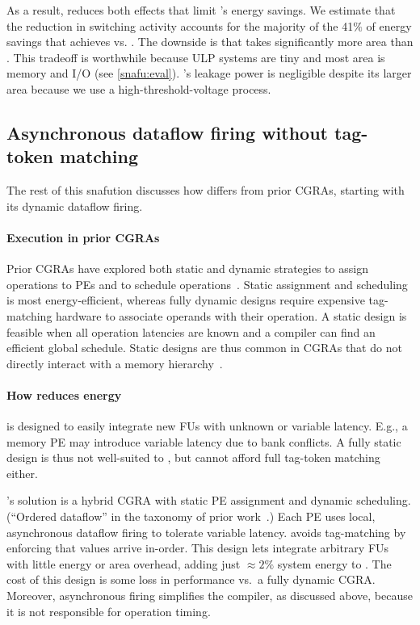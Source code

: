 As a result, \snafuframe reduces both effects that limit \manic's energy savings.
%
We estimate that the reduction in switching activity accounts for the majority of the 41$\%$ of energy savings that \snafuframe achieves vs. \manic. 
%
The downside is that \snafu takes significantly more area
than \manic.
This tradeoff is worthwhile because ULP systems are tiny and most area is memory and I/O
(see \autoref{snafu:eval}).
%
\snafu's leakage power is negligible despite its larger area because we use a high-threshold-voltage process.

\subsection{Asynchronous dataflow firing without tag-token matching}

The rest of this snafution discusses how \snafuframe differs from prior CGRAs,
starting with its dynamic dataflow firing.

\paragraph{Execution in prior CGRAs}
%
Prior CGRAs have explored both static and dynamic strategies
to assign operations to PEs
and to schedule operations~\cite{weng2020hybrid}.
%
Static assignment and scheduling is most energy-efficient,
whereas fully dynamic designs require expensive tag-matching hardware to associate operands with their operation.
%
A static design is feasible when all operation latencies are known and a
compiler can find an efficient global schedule.
%
Static designs are thus common in CGRAs that do not directly interact with a memory hierarchy~\cite{dyser,karunaratne2017hycube,nowatzki:isca17:stream-dataflow}.

\paragraph{How \snafu reduces energy}
%
\snafuframe is designed to easily integrate new FUs with unknown or variable
latency.
%
E.g., a memory PE may introduce variable latency due to bank conflicts.
%
A fully static design is thus not well-suited to \snafuframe, but \snafuframe cannot afford full tag-token matching either.

\snafuframe's solution is a hybrid CGRA with static PE assignment and dynamic scheduling.
%
(``Ordered dataflow'' in the taxonomy of prior work~\cite{weng2020hybrid}.)
%
Each PE uses local, asynchronous dataflow firing to tolerate variable latency.
%
\snafuframe avoids tag-matching by enforcing that values arrive in-order.
%
This design lets \snafuframe integrate arbitrary FUs with little energy or area overhead,
adding just $\approx2\%$ system energy to \snafuarch. 
%
The cost of this design is some loss in performance vs.\ a fully dynamic CGRA.
%
Moreover, asynchronous firing simplifies the compiler, as discussed
above, because it is not responsible for operation timing.

